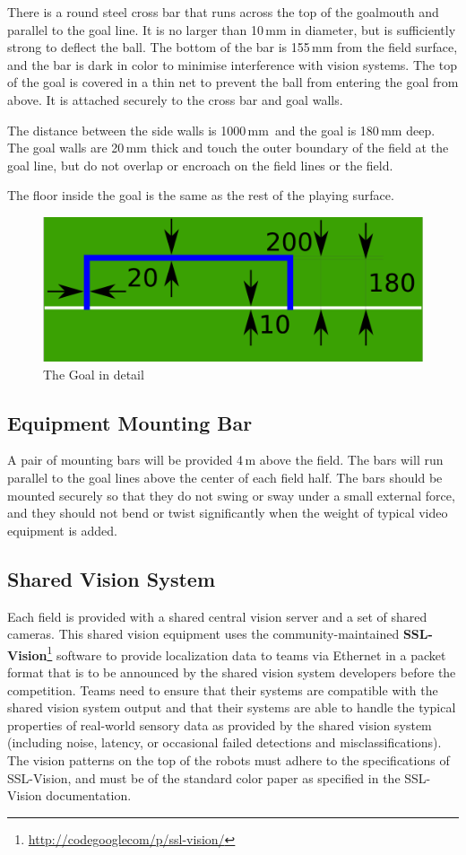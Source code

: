 There is a round steel cross bar that runs across the top of the goalmouth and
parallel to the goal line. It is no larger than 10\,mm in diameter, but is
sufficiently strong to deflect the ball. The bottom of the bar is 155\,mm from
the field surface, and the bar is dark in color to minimise interference with
vision systems. The top of the goal is covered in a thin net to prevent the ball
from entering the goal from above. It is attached securely to the cross bar and
goal walls.

The distance between the side walls is 1000\,mm\, and the goal is 180\,mm deep.
The goal walls are 20\,mm thick and touch the outer boundary of the field at
the goal line, but do not overlap or encroach on the field lines or the field.

The floor inside the goal is the same as the rest of the playing surface.

\begin{figure}[ht] %
  \centering
  \includegraphics[width=0.5\columnwidth]{img/goal_detail.png}
  \caption{The Goal in detail}
  \label{fig:sslgoal}
\end{figure}

\subsection{Equipment Mounting Bar}

A pair of mounting bars will be provided 4\,m
above the field. The bars will run parallel to the goal lines above the
center of each field half. The bars should be mounted
securely so that they do not swing or sway under a
small external force, and they should not bend or twist
significantly when the weight of typical video equipment is added.

\subsection{Shared Vision System}
Each field is provided with a shared central vision server and a set of shared
cameras. This shared vision equipment uses the community-maintained
\textbf{SSL-Vision}\footnote{\url{http://codegooglecom/p/ssl-vision/}} software
to provide localization data to teams via Ethernet in a packet format that is to
be announced by the shared vision system developers before the competition.
Teams need to ensure that their systems are compatible with the shared vision
system output and that their systems are able to handle the typical properties
of real-world sensory data as provided by the shared vision system (including
noise, latency, or occasional failed detections and misclassifications).
The vision patterns on the top of the robots must adhere to the
specifications of SSL-Vision, and must be of the standard color paper as
specified in the SSL-Vision documentation.

